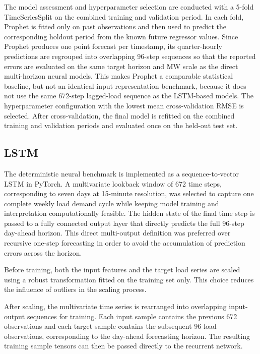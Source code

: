 \documentclass[Master,english,IEEE]{twbook}
\begin{document}
The model assessment and hyperparameter selection are conducted with a 5-fold TimeSeriesSplit on the combined training and validation period. In each fold, Prophet is fitted only on past observations and then used to predict the corresponding holdout period from the known future regressor values. Since Prophet produces one point forecast per timestamp, its quarter-hourly predictions are regrouped into overlapping 96-step sequences so that the reported errors are evaluated on the same target horizon and MW scale as the direct multi-horizon neural models. This makes Prophet a comparable statistical baseline, but not an identical input-representation benchmark, because it does not use the same 672-step lagged-load sequence as the LSTM-based models. The hyperparameter configuration with the lowest mean cross-validation RMSE is selected. After cross-validation, the final model is refitted on the combined training and validation periods and evaluated once on the held-out test set.

\subsection{LSTM}

The deterministic neural benchmark is implemented as a sequence-to-vector LSTM in PyTorch. A multivariate lookback window of 672 time steps, corresponding to seven days at 15-minute resolution, was selected to capture one complete weekly load demand cycle while keeping model training and interpretation computationally feasible. The hidden state of the final time step is passed to a fully connected output layer that directly predicts the full 96-step day-ahead horizon. This direct multi-output definition was preferred over recursive one-step forecasting in order to avoid the accumulation of prediction errors across the horizon.

Before training, both the input features and the target load series are scaled using a robust transformation fitted on the training set only. This choice reduces the influence of outliers in the scaling process.

After scaling, the multivariate time series is rearranged into overlapping input-output sequences for training. Each input sample contains the previous 672 observations and each target sample contains the subsequent 96 load observations, corresponding to the day-ahead forecasting horizon. The resulting training sample tensors can then be passed directly to the recurrent network.
\end{document}
